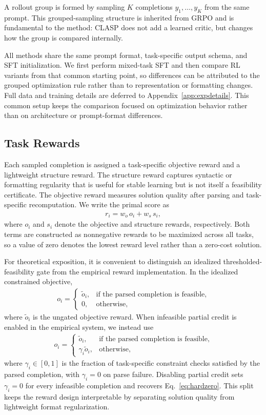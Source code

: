 \documentclass{article}
\theoremstyle{remark}
\begin{document}
A rollout group is formed by sampling \(K\) completions \(y_1,\dots,y_K\) from the same prompt. This grouped-sampling structure is inherited from GRPO and is fundamental to the method: CLASP does not add a learned critic, but changes how the group is compared internally.

All methods share the same prompt format, task-specific output schema, and SFT initialization. We first perform mixed-task SFT and then compare RL variants from that common starting point, so differences can be attributed to the grouped optimization rule rather than to representation or formatting changes. Full data and training details are deferred to Appendix~\ref{app:expdetails}.
This common setup keeps the comparison focused on optimization behavior rather than on architecture or prompt-format differences.

\subsection{Task Rewards}
Each sampled completion is assigned a task-specific objective reward and a lightweight structure reward. The structure reward captures syntactic or formatting regularity that is useful for stable learning but is not itself a feasibility certificate. The objective reward measures solution quality after parsing and task-specific recomputation. We write the primal score as
\begin{align}
r_i = w_o \, o_i + w_s \, s_i,
\label{eq:primalscore}
\end{align}
where \(o_i\) and \(s_i\) denote the objective and structure rewards, respectively.
Both terms are constructed as nonnegative rewards to be maximized across all tasks, so a value of zero denotes the lowest reward level rather than a zero-cost solution.

For theoretical exposition, it is convenient to distinguish an idealized thresholded-feasibility gate from the empirical reward implementation. In the idealized constrained objective,
\begin{align}
o_i=
\begin{cases}
\tilde{o}_i, & \text{if the parsed completion is feasible},\\
0, & \text{otherwise},
\end{cases}
\label{eq:hardzero}
\end{align}
where \(\tilde{o}_i\) is the ungated objective reward. When infeasible partial credit is enabled in the empirical system, we instead use
\begin{align}
o_i=
\begin{cases}
\tilde{o}_i, & \text{if the parsed completion is feasible},\\
\gamma_i \tilde{o}_i, & \text{otherwise},
\end{cases}
\label{eq:softgate}
\end{align}
where \(\gamma_i\in[0,1]\) is the fraction of task-specific constraint checks satisfied by the parsed completion, with \(\gamma_i=0\) on parse failure. Disabling partial credit sets \(\gamma_i=0\) for every infeasible completion and recovers Eq.~\eqref{eq:hardzero}.
This split keeps the reward design interpretable by separating solution quality from lightweight format regularization.
\end{document}
